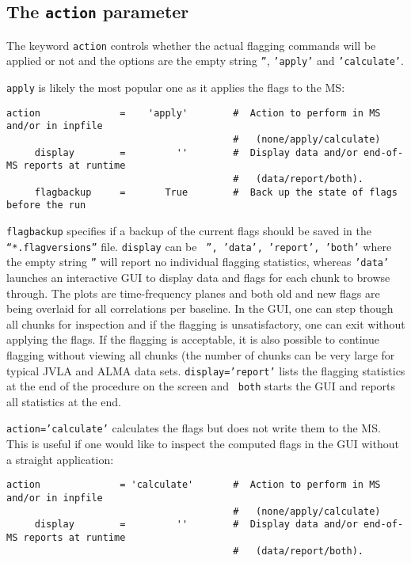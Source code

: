 \subsection{The {\tt action} parameter}
\label{section:edit.flagdata.action}

The keyword {\tt action} controls whether the actual flagging
commands will be applied or not and the options are the empty string
{\tt ''}, {\tt 'apply'} and {\tt 'calculate'}.

{\tt apply} is likely the most popular one as it applies the flags to the MS:
\small
\begin{verbatim}
action              =    'apply'        #  Action to perform in MS and/or in inpfile
                                        #   (none/apply/calculate)
     display        =         ''        #  Display data and/or end-of-MS reports at runtime
                                        #   (data/report/both).
     flagbackup     =       True        #  Back up the state of flags before the run
\end{verbatim}
\normalsize

{\tt flagbackup} specifies if a backup of the current flags should be
saved in the {\tt ``*.flagversions''} file. {\tt display} can be {\tt
  '', 'data', 'report', 'both'} where the empty string {\tt ''} will
report no individual flagging statistics, whereas {\tt 'data'}
launches an interactive GUI to display data and flags for each chunk to
browse through. The plots are time-frequency planes and both old and
new flags are being overlaid for all correlations per baseline. In the
GUI, one can step though all chunks for inspection and if the flagging
is unsatisfactory, one can exit without applying the flags. If the
flagging is acceptable, it is also possible to continue flagging
without viewing all chunks (the number of chunks can be very large for
typical JVLA and ALMA data sets. {\tt display='report'} lists the
flagging statistics at the end of the procedure on the screen and {\tt
  both} starts the GUI and reports all statistics at the end.


{\tt action='calculate'} calculates the flags but does not write
them to the MS. This is useful if one would like to inspect the
computed flags in the GUI without a straight application:

\small
\begin{verbatim}
action              = 'calculate'       #  Action to perform in MS and/or in inpfile
                                        #   (none/apply/calculate)
     display        =         ''        #  Display data and/or end-of-MS reports at runtime
                                        #   (data/report/both).
\end{verbatim}
\normalsize

